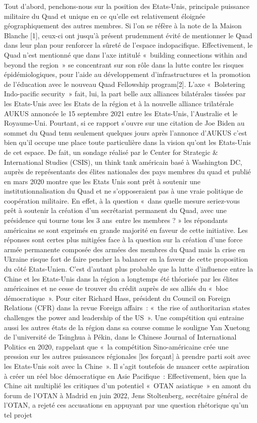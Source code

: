 \documentclass[11pt,a4paper]{article}
\begin{document}
Tout d'abord, penchons-nous sur la position des Etats-Unis, principale puissance militaire du Quad et unique en ce qu'elle est relativement éloignée géographiquement des autres membres. Si l'on se réfère à la note de la Maison Blanche {[}1{]}, ceux-ci ont jusqu'à présent prudemment évité de mentionner le Quad dans leur plan pour renforcer la sûreté de l'espace indopacifique. Effectivement, le Quad n'est mentionné que dans l'axe intitulé «~building connections within and beyond the region~» se concentrant sur son rôle dans la lutte contre les risques épidémiologiques, pour l'aide au développement d'infrastructures et la promotion de l'éducation avec le nouveau Quad Fellowship program{[}2{]}. L'axe «~Bolstering Indo-pacific security~» fait, lui, la part belle aux alliances bilatérales tissées par les Etats-Unis avec les Etats de la région et à la nouvelle alliance trilatérale AUKUS annoncée le 15 septembre 2021 entre les Etats-Unis, l'Australie et le Royaume-Uni. Pourtant, si ce rapport s'ouvre sur une citation de Joe Biden au sommet du Quad tenu seulement quelques jours après l'annonce d'AUKUS c'est bien qu'il occupe une place toute particulière dans la vision qu'ont les Etats-Unis de cet espace. De fait, un sondage réalisé par le Center for Strategic \& International Studies (CSIS), un think tank américain basé à Washington DC, auprès de représentants des élites nationales des pays membres du quad et publié en mars 2020 montre que les Etats Unis sont prêt à soutenir une institutionnalisation du Quad et ne s'opposeraient pas à une vraie politique de coopération militaire. En effet, à la question «~dans quelle mesure seriez-vous prêt à soutenir la création d'un secrétariat permanent du Quad, avec une présidence qui tourne tous les 3 ans~entre les membres ? » les répondants américains se sont exprimés en grande majorité en faveur de cette initiative. Les réponses sont certes plus mitigées face à la question sur la création d'une force armée permanente composée des armées des membres du Quad mais la crise en Ukraine risque fort de faire pencher la balancer en la faveur de cette proposition du côté Etats-Unien. C'est d'autant plus probable que la lutte d'influence entre la Chine et les Etats-Unis dans la région a longtemps été théorisée par les élites américaines et ne cesse de trouver du crédit auprès de ses alliés du «~bloc démocratique~». Pour citer Richard Hass, président du Council on Foreign Relations (CFR) dans la revue Foreign affairs~: «~the rise of authoritarian states challenges the power and leadership of the US~». Une compétition qui entraine aussi les autres états de la région dans sa course comme le souligne Yan Xuetong de l'université de Tsinghua à Pékin, dans le Chinese Journal of International Politics en 2020, rappelant que «~la compétition Sino-américaine crée une pression sur les autres puissances régionales {[}les forçant{]} à prendre parti soit avec les Etats-Unis soit avec la Chine~». Il s'agit toutefois de nuancer cette aspiration à créer un réel bloc démocratique en Asie Pacifique~: Effectivement, bien que la Chine ait multiplié les critiques d'un potentiel «~OTAN asiatique~» en amont du forum de l'OTAN à Madrid en juin 2022, Jens Stoltenberg, secrétaire général de l'OTAN, a rejeté ces accusations en appuyant par une question rhétorique qu'un tel projet 
\end{document}
